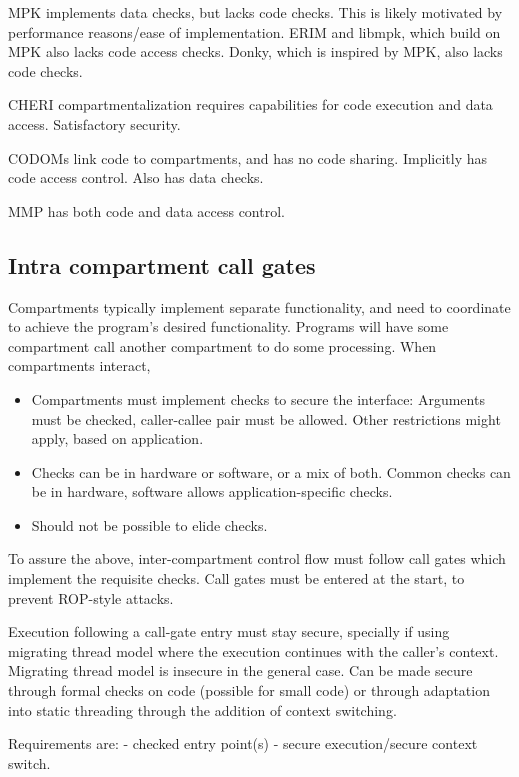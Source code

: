 MPK implements data checks, but lacks code checks. 
This is likely motivated by performance reasons/ease of implementation.
ERIM and libmpk, which build on MPK also lacks code access checks.
Donky, which is inspired by MPK, also lacks code checks.

CHERI compartmentalization requires capabilities for code execution and
data access. Satisfactory security.

CODOMs link code to compartments, and has no code sharing.
Implicitly has code access control.
Also has data checks.

MMP has both code and data access control.

\subsection{Intra compartment call gates}

Compartments typically implement separate functionality, and
need to coordinate to achieve the program's desired functionality.
Programs will have some compartment call another compartment to
do some processing.
When compartments interact, 
\begin{itemize}
      \item Compartments must implement checks to secure the interface:
            Arguments must be checked, caller-callee pair must be
            allowed.
            Other restrictions might apply, based on application.
      \item Checks can be in hardware or software, or a mix of both.
            Common checks can be in hardware, software allows 
            application-specific checks.
      \item Should not be possible to elide checks.
\end{itemize}
To assure the above, inter-compartment control flow must follow call gates
which implement the requisite checks.
Call gates must be entered at the start, to prevent ROP-style attacks.

Execution following a call-gate entry must stay secure, specially if using
migrating thread model where the execution continues with the caller's 
context.
Migrating thread model is insecure in the general case. 
Can be made secure through formal checks on code (possible for small code)
or through adaptation into static threading through the addition of context
switching.

Requirements are:
- checked entry point(s)
- secure execution/secure context switch.

